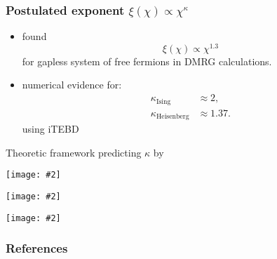 \documentclass{beamer}
\newcommand{\includeproper}[2][0.8]{\texttt{[image: \#2]}}
\begin{document}
\begin{frame}
  \frametitle{Postulated exponent $\xi(\chi) \propto \chi^{\kappa}$}

  \begin{itemize}
    \item \cite{andersson1999density} found
    \begin{equation}
      \xi(\chi) \propto \chi^{1.3}
    \end{equation}
    for gapless system of free fermions in DMRG calculations.
    \item \cite{tagliacozzo2008scaling} numerical evidence for:
      \begin{align}
        \kappa_{\text{Ising}} & \approx 2, \\
        \kappa_{\text{Heisenberg}} & \approx 1.37.
      \end{align}
      using iTEBD
  \end{itemize}

\end{frame}

\begin{frame}
  Theoretic framework predicting $\kappa$ by \cite{pollmann2009theory}
\end{frame}

\begin{frame}
  \includeproper[]{correlation_length_vs_chi_Tcrit_power_law_fit_chi8-112_tol1e-7.pdf}
\end{frame}

\begin{frame}
  \includeproper[]{correlation_length_vs_chi_power_law_fit_q2_chi8-50_tol1e-7_symmetric_boundary.pdf}
\end{frame}

\begin{frame}
  \includeproper[]{correlation_length_Tc_q2_tol1e-7_fixed_and_symmetric.pdf}
\end{frame}


\begin{frame}[allowframebreaks]
  \frametitle{References}
  \printbibliography
\end{frame}
\end{document}
